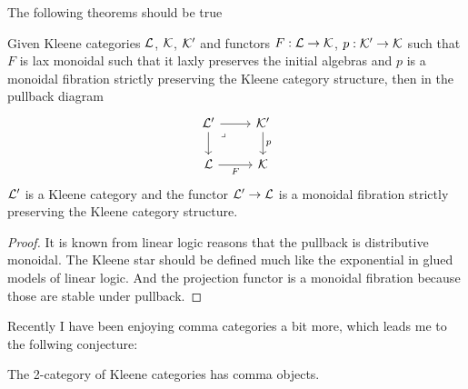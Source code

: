 \documentclass[acmsmall,anonymous,review,screen]{acmart}
\newcommand{\cat}[1]{
  \relax
  \StrLen{#1}[\arglength]
  \ifnum\arglength=1
  \mathcal{#1}
  \else
  \mathbf{#1}
  \fi
}
\begin{document}
The following theorems should be true
\begin{theorem}
  Given Kleene categories $\cat{L}$, $\cat{K}$, $\cat{K}'$
  and functors $F : \cat{L} \to \cat{K}$, $p : \cat{K}' \to \cat{K}$
  such that $F$ is lax monoidal such that it laxly preserves the initial
  algebras and $p$ is a monoidal fibration strictly preserving the
  Kleene category structure, then in the pullback diagram
\[\begin{tikzcd}
	{\cat{L}'} & {\cat{K}'} \\
	{\cat{L}} & {\cat{K}}
	\arrow[from=1-1, to=1-2]
	\arrow[from=1-1, to=2-1]
	\arrow["\lrcorner"{anchor=center, pos=0.125}, draw=none, from=1-1, to=2-2]
	\arrow["p", from=1-2, to=2-2]
	\arrow["F"', from=2-1, to=2-2]
\end{tikzcd}\]
$\cat{L}'$ is a Kleene category and the functor $\cat{L}'\to \cat{L}$ is a
monoidal fibration strictly preserving the Kleene category structure.
\end{theorem}
\begin{proof}
  It is known from linear logic reasons that the pullback is distributive monoidal.
  The Kleene star should be defined much like the exponential in glued models of
  linear logic. And the projection functor is a monoidal fibration because those
  are stable under pullback.
\end{proof}

Recently I have been enjoying comma categories a bit more, which leads me to the follwing
conjecture:

\begin{conjecture}
  The 2-category of Kleene categories has comma objects.
\end{conjecture}
\end{document}
